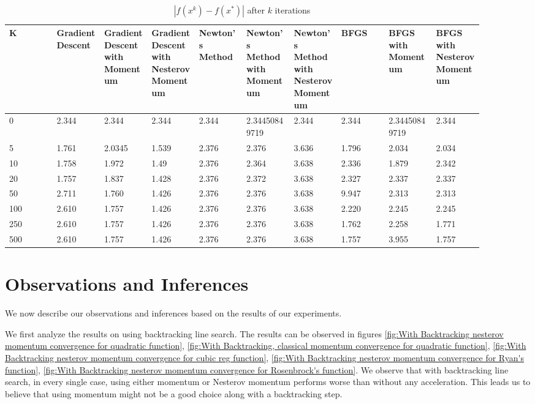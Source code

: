 \documentclass{article}
\begin{document}
\begin{table}[H]
	\centering
	\caption{$ | f(x^k) - f(x^*) | $ after $k$ iterations}
	\label{Levy's function table}
	\begin{tabular}{|l|p{0.1\linewidth}|p{0.1\linewidth}|p{0.1\linewidth}|p{0.1\linewidth}|p{0.1\linewidth}|p{0.1\linewidth}|p{0.1\linewidth}|p{0.1\linewidth}|p{0.1\linewidth}|}
		\hline
		K & Gradient Descent & Gradient Descent with Momentum & Gradient Descent with Nesterov Momentum & Newton's Method & Newton's Method with Momentum & Newton's Method with Nesterov Momentum & BFGS & BFGS with Momentum & BFGS with Nesterov Momentum \\
		\hline
		0 & 2.344 & 2.344 & 2.344 & 2.344 & 2.34450849719 & 2.344 & 2.344 & 2.34450849719 & 2.344 \\
		\hline
		5 & 1.761 & 2.0345 & 1.539 & 2.376 & 2.376 & 3.636 & 1.796 & 2.034 & 2.034 \\
		\hline
		10 & 1.758 & 1.972 & 1.49 & 2.376 & 2.364 & 3.638 & 2.336 & 1.879 & 2.342 \\
		\hline
		20 & 1.757 & 1.837 & 1.428 & 2.376 & 2.372 & 3.638 & 2.327 & 2.337 & 2.337 \\
		\hline
		50 & 2.711 & 1.760 & 1.426 & 2.376 & 2.376 & 3.638 & 9.947 & 2.313 & 2.313 \\
		\hline
		100 & 2.610 & 1.757 & 1.426 & 2.376& 2.376 & 3.638 & 2.220 & 2.245 & 2.245 \\
		\hline
		250 & 2.610 & 1.757 & 1.426 & 2.376 & 2.376 & 3.638 & 1.762 & 2.258 & 1.771 \\
		\hline
		500 & 2.610 & 1.757 & 1.426 & 2.376 & 2.376 & 3.638 & 1.757 & 3.955 & 1.757 \\
		\hline
	\end{tabular}
\end{table}

\section{Observations and Inferences}\label{inferences}
We now describe our observations and inferences based on the results of our experiments.

We first analyze the results on using backtracking line search. The results can be observed in figures \ref{fig:With Backtracking nesterov momentum convergence for quadratic function}, \ref{fig:With Backtracking, classical momentum convergence for quadratic function},
\ref{fig:With Backtracking nesterov momentum convergence for cubic reg function},
\ref{fig:With Backtracking nesterov momentum convergence for Ryan's function},
\ref{fig:With Backtracking nesterov momentum convergence for Rosenbrock's function}. We observe that with backtracking line search, in every single case, using either momentum or Nesterov momentum performs worse than without any acceleration. This leads us to believe that using momentum might not be a good choice along with a backtracking step.
\end{document}
